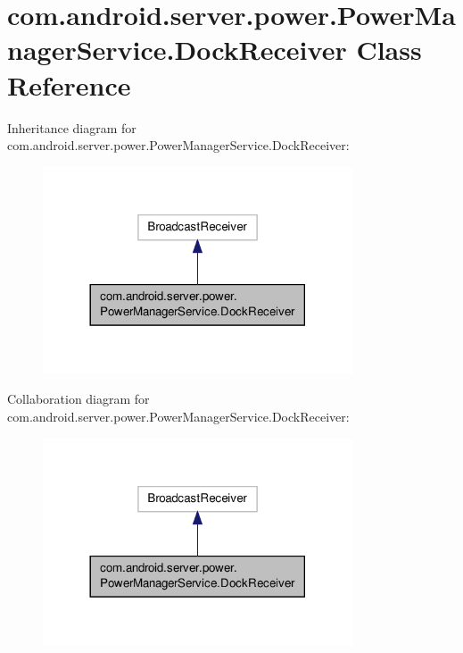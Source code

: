 \hypertarget{classcom_1_1android_1_1server_1_1power_1_1PowerManagerService_1_1DockReceiver}{\section{com.\-android.\-server.\-power.\-Power\-Manager\-Service.\-Dock\-Receiver Class Reference}
\label{classcom_1_1android_1_1server_1_1power_1_1PowerManagerService_1_1DockReceiver}
}


Inheritance diagram for com.\-android.\-server.\-power.\-Power\-Manager\-Service.\-Dock\-Receiver\-:
\nopagebreak
\begin{figure}[H]
\begin{center}
\leavevmode
\includegraphics[width=260pt]{classcom_1_1android_1_1server_1_1power_1_1PowerManagerService_1_1DockReceiver__inherit__graph}
\end{center}
\end{figure}


Collaboration diagram for com.\-android.\-server.\-power.\-Power\-Manager\-Service.\-Dock\-Receiver\-:
\nopagebreak
\begin{figure}[H]
\begin{center}
\leavevmode
\includegraphics[width=260pt]{classcom_1_1android_1_1server_1_1power_1_1PowerManagerService_1_1DockReceiver__coll__graph}
\end{center}
\end{figure}
